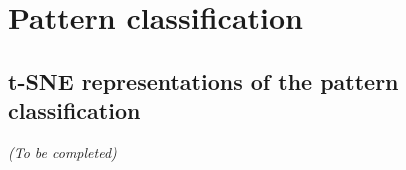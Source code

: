 
\graphicspath{{../../figures/appendix/}}

\chapter{Pattern classification}
\label{ch:cell_pattern_classification}

\newpage

\section{t-SNE representations of the pattern classification}
\label{sec:tsne_classification}

\begin{center}
	\textit{(To be completed)}
\end{center}

\vfill

